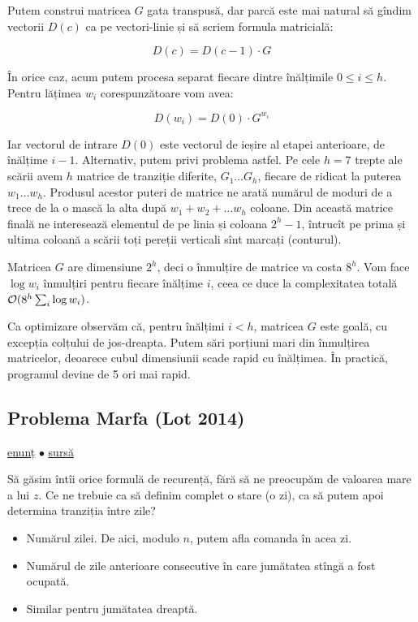 \documentclass[../main.tex]{subfiles}
\begin{document}
Putem construi matricea $G$ gata transpusă, dar parcă este mai natural să gîndim vectorii $D(c)$ ca pe vectori-linie și să scriem formula matricială:

$$D(c) = D(c-1) \cdot G$$

În orice caz, acum putem procesa separat fiecare dintre înălțimile $0 \leq i \leq h$. Pentru lățimea $w_i$ corespunzătoare vom avea:

$$D(w_i) = D(0) \cdot G^{w_i}$$

Iar vectorul de intrare $D(0)$ este vectorul de ieșire al etapei anterioare, de înălțime $i-1$. Alternativ, putem privi problema astfel. Pe cele $h=7$ trepte ale scării avem $h$ matrice de tranziție diferite, $G_1 \dots G_h$, fiecare de ridicat la puterea $w_1 \dots w_h$. Produsul acestor puteri de matrice ne arată numărul de moduri de a trece de la o mască la alta după $w_1 + w_2 + \dots w_h$ coloane. Din această matrice finală ne interesează elementul de pe linia și coloana $2^h - 1$, întrucît pe prima și ultima coloană a scării toți pereții verticali sînt marcați (conturul).

Matricea $G$ are dimensiune $2^h$, deci o înmulțire de matrice va costa $8^h$. Vom face $\log w_i$ înmulțiri pentru fiecare înălțime $i$, ceea ce duce la complexitatea totală $\mathcal{O}(8^h \sum_i \log w_i)$.

Ca optimizare observăm că, pentru înălțimi $i < h$, matricea $G$ este goală, cu excepția colțului de jos-dreapta. Putem sări porțiuni mari din înmulțirea matricelor, deoarece cubul dimensiunii scade rapid cu înălțimea. În practică, programul devine de 5 ori mai rapid.

\subsection{Problema Marfa (Lot 2014)}
\label{problem:marfa}

\href{https://kilonova.ro/problems/2030}{enunț}
$\bullet$
\hyperref[code:marfa]{sursă}

Să găsim întîi orice formulă de recurență, fără să ne preocupăm de valoarea mare a lui $z$. Ce ne trebuie ca să definim complet o stare (o zi), ca să putem apoi determina tranziția între zile?

\begin{itemize}
  \item Numărul zilei. De aici, modulo $n$, putem afla comanda în acea zi.
  \item Numărul de zile anterioare consecutive în care jumătatea stîngă a fost ocupată.
  \item Similar pentru jumătatea dreaptă.
\end{itemize}
\end{document}
